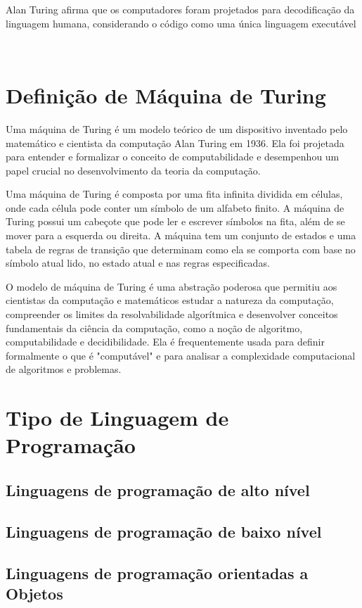 \documentclass[tcc/ec]{faeng}
\begin{document}
Alan Turing afirma que os computadores foram projetados para decodificação da linguagem humana, considerando o código como uma única linguagem executável

\

\section{Definição de Máquina de Turing}
Uma máquina de Turing é um modelo teórico de um dispositivo inventado pelo matemático e cientista da computação Alan Turing em 1936. Ela foi projetada para entender e formalizar o conceito de computabilidade e desempenhou um papel crucial no desenvolvimento da teoria da computação.

Uma máquina de Turing é composta por uma fita infinita dividida em células, onde cada célula pode conter um símbolo de um alfabeto finito. A máquina de Turing possui um cabeçote que pode ler e escrever símbolos na fita, além de se mover para a esquerda ou direita. A máquina tem um conjunto de estados e uma tabela de regras de transição que determinam como ela se comporta com base no símbolo atual lido, no estado atual e nas regras especificadas.

O modelo de máquina de Turing é uma abstração poderosa que permitiu aos cientistas da computação e matemáticos estudar a natureza da computação, compreender os limites da resolvabilidade algorítmica e desenvolver conceitos fundamentais da ciência da computação, como a noção de algoritmo, computabilidade e decidibilidade. Ela é frequentemente usada para definir formalmente o que é "computável" e para analisar a complexidade computacional de algoritmos e problemas.

\section{Tipo de Linguagem de Programação}

\subsection{Linguagens de programação de alto nível}

\subsection{Linguagens de programação de baixo nível}

\subsection{Linguagens de programação orientadas a Objetos}
\end{document}
